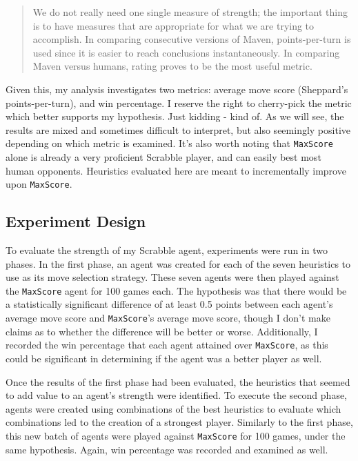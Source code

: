 \documentclass[letterpaper]{article}
\begin{document}
\begin{quote}
We do not really need one single measure of strength; the important thing is to have measures that are appropriate for what we are trying to accomplish. In comparing consecutive  versions  of  Maven, points-per-turn is used since it is easier to reach conclusions instantaneously. In comparing Maven versus humans, rating proves to be the most useful metric. \cite{1sheppard2002}
\end{quote}

Given this, my analysis investigates two metrics: average move score  (Sheppard's points-per-turn), and win percentage. I reserve the right to cherry-pick the metric which better supports my hypothesis. Just kidding - kind of. As we will see, the results are mixed and sometimes difficult to interpret, but also seemingly positive depending on which metric is examined. It's also worth noting that \texttt{MaxScore} alone is already a very proficient Scrabble player, and can easily best most human opponents. Heuristics evaluated here are meant to incrementally improve upon \texttt{MaxScore}.

\subsection{Experiment Design}
To evaluate the strength of my Scrabble agent, experiments were run in two phases. In the first phase, an agent was created for each of the seven heuristics to use as its move selection strategy. These seven agents were then played against the \texttt{MaxScore} agent for 100 games each. The hypothesis was that there would be a statistically significant difference of at least 0.5 points between each agent's average move score and \texttt{MaxScore}'s average move score, though I don't make claims as to whether the difference will be better or worse. Additionally, I recorded the win percentage that each agent attained over \texttt{MaxScore}, as this could be significant in determining if the agent was a better player as well.

Once the results of the first phase had been evaluated, the heuristics that seemed to add value to an agent's strength were identified. To execute the second phase, agents were created using combinations of the best heuristics to evaluate which combinations led to the creation of a strongest player. Similarly to the first phase, this new batch of agents were played against \texttt{MaxScore} for 100 games, under the same hypothesis. Again, win percentage was recorded and examined as well.
\end{document}

